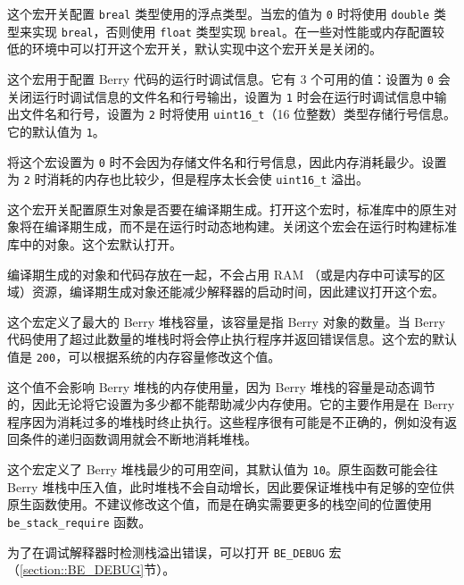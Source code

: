 
这个宏开关配置 \texttt{breal} 类型使用的浮点类型。当宏的值为 \texttt{0} 时将使用 \texttt{double} 类型来实现 \texttt{breal}，否则使用 \texttt{float} 类型实现 \texttt{breal}。在一些对性能或内存配置较低的环境中可以打开这个宏开关，默认实现中这个宏开关是关闭的。


这个宏用于配置 Berry 代码的运行时调试信息。它有 3 个可用的值：设置为 \texttt{0} 会关闭运行时调试信息的文件名和行号输出，设置为 \texttt{1} 时会在运行时调试信息中输出文件名和行号，设置为 \texttt{2} 时将使用 \texttt{uint16\_t}（16 位整数）类型存储行号信息。它的默认值为 \texttt{1}。

将这个宏设置为 \texttt{0} 时不会因为存储文件名和行号信息，因此内存消耗最少。设置为 \texttt{2} 时消耗的内存也比较少，但是程序太长会使 \texttt{uint16\_t} 溢出。


这个宏开关配置原生对象是否要在编译期生成。打开这个宏时，标准库中的原生对象将在编译期生成，而不是在运行时动态地构建。关闭这个宏会在运行时构建标准库中的对象。这个宏默认打开。

编译期生成的对象和代码存放在一起，不会占用 RAM （或是内存中可读写的区域）资源，编译期生成对象还能减少解释器的启动时间，因此建议打开这个宏。


这个宏定义了最大的 Berry 堆栈容量，该容量是指 Berry 对象的数量。当 Berry 代码使用了超过此数量的堆栈时将会停止执行程序并返回错误信息。这个宏的默认值是 \texttt{200}，可以根据系统的内存容量修改这个值。

这个值不会影响 Berry 堆栈的内存使用量，因为 Berry 堆栈的容量是动态调节的，因此无论将它设置为多少都不能帮助减少内存使用。它的主要作用是在 Berry 程序因为消耗过多的堆栈时终止执行。这些程序很有可能是不正确的，例如没有返回条件的递归函数调用就会不断地消耗堆栈。


这个宏定义了 Berry 堆栈最少的可用空间，其默认值为 \texttt{10}。原生函数可能会往 Berry 堆栈中压入值，此时堆栈不会自动增长，因此要保证堆栈中有足够的空位供原生函数使用。不建议修改这个值，而是在确实需要更多的栈空间的位置使用 \texttt{be\_stack\_require} 函数。

为了在调试解释器时检测栈溢出错误，可以打开 \texttt{BE\_DEBUG} 宏（\ref{section::BE_DEBUG}节）。


